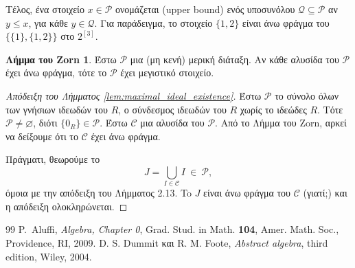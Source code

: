 \documentclass[12pt,a4paper,reqno]{amsart}
\theoremstyle{definition}
\newtheorem*{zorn}{Λήμμα του Zorn}
\theoremstyle{remark}
\numberwithin{theorem}{section}
\numberwithin{exercise}{section}
\numberwithin{equation}{section}
\newcommand{\cC}{\mathcal{C}}
\newcommand{\pP}{\mathcal{P}}
\newcommand{\qQ}{\mathcal{Q}}
\renewcommand{\emptyset}{\varnothing}
\newcommand{\defn}[1]{{\color{mylightblue}{#1}}}
\begin{document}
Τέλος, ένα στοιχείο $x \in \pP$ ονομάζεται \defn{άνω φράγμα} (upper bound) ενός υποσυνόλου $\qQ \subseteq \pP$ αν $y \le x$, για κάθε $y \in \qQ$. Για παράδειγμα, το στοιχείο $\{1,2\}$ είναι άνω φράγμα του $\{ \{1\}, \{1,2\} \}$ στο $2^{[3]}$.

\begin{zorn}
    Έστω $\pP$ μια (μη κενή) μερική διάταξη. Αν κάθε αλυσίδα του $\pP$ έχει άνω φράγμα, τότε το $\pP$ έχει μεγιστικό στοιχείο.
\end{zorn}

\begin{proof}[Απόδειξη του Λήμματος \ref{lem:maximal_ideal_existence}]
    Έστω $\pP$ το σύνολο όλων των γνήσιων ιδεωδών του $R$, ο σύνδεσμος ιδεωδών του $R$ χωρίς το ιδεώδες $R$. Τότε $\pP \neq \emptyset$, διότι $\{0_R\} \in \pP$. Έστω $\cC$ μια αλυσίδα του $\pP$. Από το Λήμμα του Zorn, αρκεί να δείξουμε ότι το $\cC$ έχει άνω φράγμα.

    Πράγματι, θεωρούμε το 
    \[
    J = \bigcup_{I \in \cC} I \ \in \ \pP,
    \]
    όμοια με την απόδειξη του Λήμματος 2.13. To $J$ είναι άνω φράγμα του $\cC$ (γιατί;) και η απόδειξη ολοκληρώνεται.
\end{proof}

\begin{thebibliography}{99}
    P.~Aluffi,
    \textit{Algebra, Chapter 0},
    Grad. Stud. in Math. {\bf104},
    Amer. Math. Soc., Providence, RI, 2009.
    D. S. Dummit και R. M. Foote, 
    \textit{Abstract algebra},
    third edition, Wiley, 2004. 
\end{thebibliography}
\end{document}
